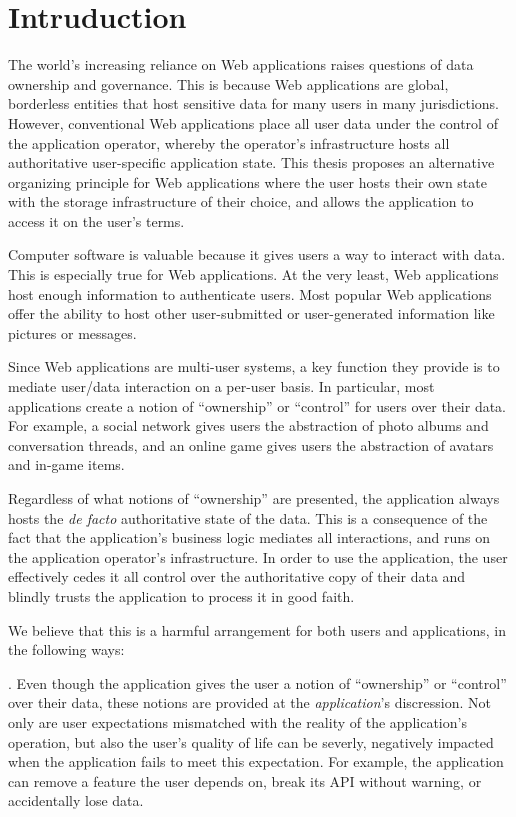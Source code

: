 \section{Intruduction}
\label{sec:introduction}

The world's increasing reliance on Web applications raises questions of data ownership and
governance.  This is because Web applications are global, borderless entities that host
sensitive data for many users in many jurisdictions.  However, conventional
Web applications place all user data under the control of the
application operator, whereby the operator's infrastructure hosts
all authoritative user-specific application state.  This thesis proposes an alternative 
organizing principle for Web applications where the user hosts their own state with the storage
infrastructure of their choice, and allows the application to access it on the
user's terms.

Computer software is valuable because it gives users a way to interact with
data.  This is especially true for Web applications.
At the very least, Web applications host enough information to authenticate
users.  Most popular Web applications offer the ability to host other
user-submitted or user-generated information like pictures or messages.

Since Web applications are multi-user systems, a key function they provide is
to mediate user/data interaction on a per-user basis.  In particular, most applications
create a notion of ``ownership'' or
``control'' for users over their data.  For example, a social network gives users the abstraction
of photo albums and conversation threads, and an online game gives users the
abstraction of avatars and in-game items.

Regardless of what notions of ``ownership''
are presented, the application always hosts the \textit{de
facto} authoritative state of the data.  This is a consequence of the fact that
the application's business logic mediates all interactions, and runs on the application operator's
infrastructure.  In order to use the application, the user effectively cedes it all
control over the authoritative copy of their data and blindly trusts the application to
process it in good faith.

We believe that this is a harmful arrangement for both users and applications,
in the following ways:

.  Even though the application gives
the user a notion of ``ownership'' or
``control'' over their data, these notions are provided at the
\textit{application}'s discression.  Not only are user expectations mismatched
with the reality of the application's operation, but also the user's quality of
life can be severly, negatively impacted when the application fails to
meet this expectation.  For example, the application can remove a feature the
user depends on, break its API without warning, or accidentally lose data.

